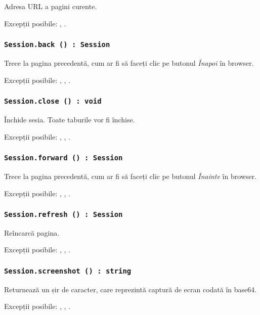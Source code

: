 Adresa URL a pagini curente.

Excepții posibile: , .

\subsubsection{\lstinline|Session.back () : Session|}

Trece la pagina precedentă, cum ar fi să faceți clic pe butonul \textit{Înapoi} în browser.

Excepții posibile: , , .

\subsubsection{\lstinline|Session.close () : void|}

Închide sesia. Toate taburile vor fi închise.

Excepții posibile: , , .

\subsubsection{\lstinline|Session.forward () : Session|}

Trece la pagina precedentă, cum ar fi să faceți clic pe butonul \textit{Înainte} în browser.

Excepții posibile: , , .

\subsubsection{\lstinline|Session.refresh () : Session|}

Reîncarcă pagina.

Excepții posibile: , , .

\subsubsection{\lstinline|Session.screenshot () : string|}

Returnează un șir de caracter, care reprezintă captură de ecran codată în base64.

Excepții posibile: , , .

